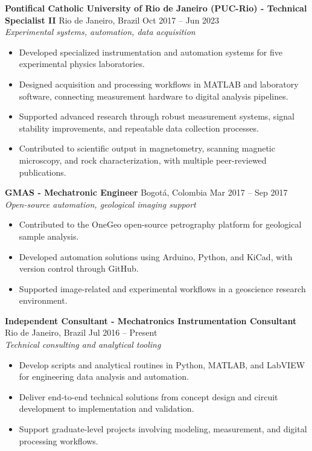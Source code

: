 \documentclass[11pt,a4paper]{article}
\newcommand{\job}[4]{\textbf{#1} \hfill #2\\\textit{#3}\\#4\vspace{6pt}}
\begin{document}
\job{Pontifical Catholic University of Rio de Janeiro (PUC-Rio) - Technical Specialist II}{Rio de Janeiro, Brazil \hfill Oct 2017 -- Jun 2023}{Experimental systems, automation, data acquisition}{
\begin{itemize}[leftmargin=*,itemsep=2pt,topsep=2pt]
\item Developed specialized instrumentation and automation systems for five experimental physics laboratories.
\item Designed acquisition and processing workflows in MATLAB and laboratory software, connecting measurement hardware to digital analysis pipelines.
\item Supported advanced research through robust measurement systems, signal stability improvements, and repeatable data collection processes.
\item Contributed to scientific output in magnetometry, scanning magnetic microscopy, and rock characterization, with multiple peer-reviewed publications.
\end{itemize}}

\job{GMAS - Mechatronic Engineer}{Bogotá, Colombia \hfill Mar 2017 -- Sep 2017}{Open-source automation, geological imaging support}{
\begin{itemize}[leftmargin=*,itemsep=2pt,topsep=2pt]
\item Contributed to the OneGeo open-source petrography platform for geological sample analysis.
\item Developed automation solutions using Arduino, Python, and KiCad, with version control through GitHub.
\item Supported image-related and experimental workflows in a geoscience research environment.
\end{itemize}}

\job{Independent Consultant - Mechatronics \/ Instrumentation Consultant}{Rio de Janeiro, Brazil \hfill Jul 2016 -- Present}{Technical consulting and analytical tooling}{
\begin{itemize}[leftmargin=*,itemsep=2pt,topsep=2pt]
\item Develop scripts and analytical routines in Python, MATLAB, and LabVIEW for engineering data analysis and automation.
\item Deliver end-to-end technical solutions from concept design and circuit development to implementation and validation.
\item Support graduate-level projects involving modeling, measurement, and digital processing workflows.
\end{itemize}}
\end{document}
